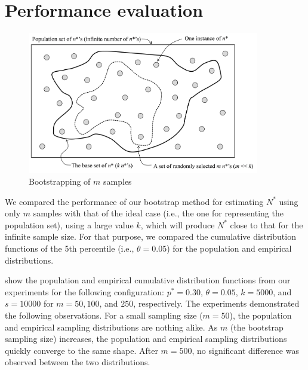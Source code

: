 \documentclass[ ../main.tex]{subfiles}
\begin{document}
\section{Performance evaluation}
\label{performance-evaluation}
\begin{figure}
\label{fig3}
\centering
\includegraphics[width=0.9\textwidth]{images/fig3.png}
\caption{Bootstrapping of $m$ samples}
\end{figure}



We compared the performance of our bootstrap method for estimating $N^*$ using only $m$ samples with that of the ideal case (i.e., the one for representing the population set), using a large value
$k$, which will produce $N^*$ close to that for the infinite sample size. For that purpose, we compared the cumulative distribution functions of the 5th percentile (i.e., $\theta = 0.05$) for the population and empirical distributions.

 show the population and empirical cumulative distribution functions from our experiments for the following configuration: $p^* = 0.30$, $\theta = 0.05$, $k = 5000$, and $s = 10000$ for $m = 50, 100$, and $250$, respectively. The experiments demonstrated the following observations. For a small sampling size ($m = 50$), the population and empirical sampling distributions are nothing alike. As $m$ (the bootstrap sampling size) increases, the population and empirical sampling distributions quickly converge to the same shape. After $m = 500$, no significant difference was observed between the two distributions.
\end{document}
